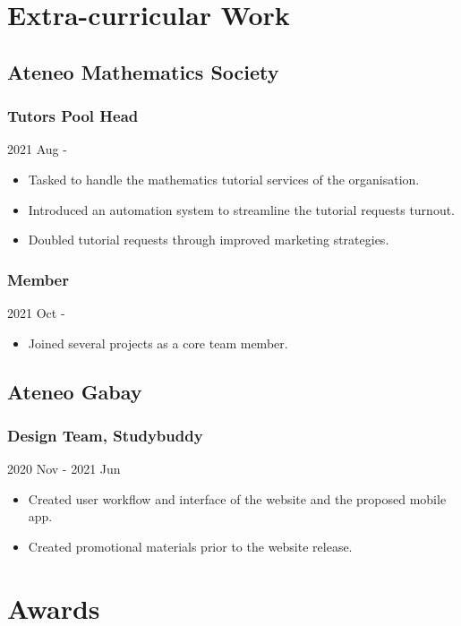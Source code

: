 \begin{multicols}{2}
\section{Extra-curricular Work}

\subsection{Ateneo Mathematics Society}
\subsubsection{Tutors Pool Head}\hfill 2021 Aug - 

\begin{itemize}[noitemsep, topsep=0.25em]
\item Tasked to handle the mathematics tutorial services of the organisation.
\item Introduced an automation system to streamline the tutorial requests turnout.

\item Doubled tutorial requests through improved marketing strategies.
\end{itemize}
\subsubsection{Member} \hfill 2021 Oct -

\begin{itemize}[noitemsep, topsep=0.25em]
\item Joined several projects as a core team member.
\end{itemize}

\subsection{Ateneo Gabay}
\subsubsection{Design Team, Studybuddy}\hfill 2020 Nov - 2021 Jun

\begin{itemize}[noitemsep, topsep=0.25em]
\item Created user workflow and interface of the website and the proposed mobile app.
\item Created promotional materials prior to the website release.
\end{itemize}

\section{Awards}


\end{multicols}
